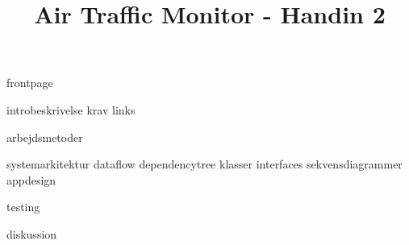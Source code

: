 \documentclass[a4paper]{article}								%
\title{Air Traffic Monitor - Handin 2}
\begin{document}

	{frontpage}

	\tableofcontents\thispagestyle{fancy} \newpage
	
	
	{introbeskrivelse}
	{krav}
	{links}

	{arbejdsmetoder}

	{systemarkitektur}
	{dataflow}
	{dependencytree}
	{klasser}
	{interfaces}
	{sekvensdiagrammer}
	{appdesign}

	{testing}

	{diskussion}
	



\end{document}

